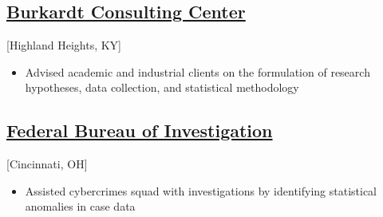 \subsection{\href{https://www.nku.edu/academics/artsci/about/departments/math/about/centers/bcc.html}{Burkardt Consulting Center}}[Highland Heights, KY]
\begin{positions}
\end{positions}

\begin{itemize}
  \item Advised academic and industrial clients on the formulation of research hypotheses, data collection, and statistical methodology
\end{itemize} 

\subsection{\href{https://www.fbi.gov/investigate}{Federal Bureau of Investigation}}[Cincinnati, OH]
\begin{positions}
\end{positions}

\begin{itemize}
  \item Assisted cybercrimes squad with investigations by identifying statistical anomalies in case data
\end{itemize}